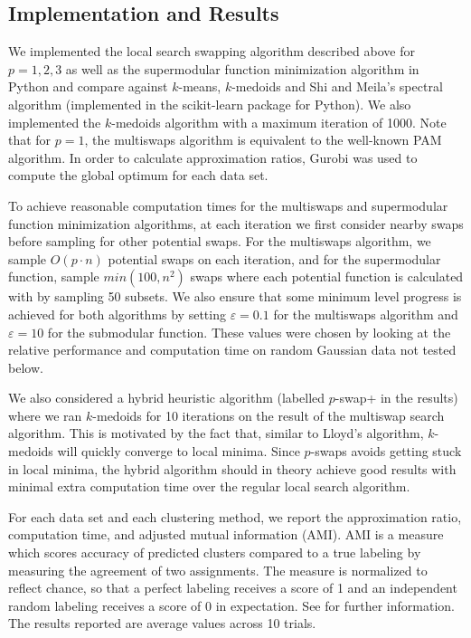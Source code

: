 \documentclass{article}
\begin{document}
\subsection{Implementation and Results}

We implemented the local search swapping algorithm described above for $p=1, 2, 3$ as well as the supermodular function minimization algorithm in Python and compare against $k$-means, $k$-medoids and Shi and Meila's spectral algorithm (implemented in the scikit-learn package for Python).  We also implemented the $k$-medoids algorithm with a maximum iteration of 1000. Note that for $p=1$, the multiswaps algorithm is equivalent to the well-known PAM algorithm.  In order to calculate approximation ratios, Gurobi was used to compute the global optimum for each data set.

To achieve reasonable computation times for the multiswaps and supermodular function minimization algorithms, at each iteration we first consider nearby swaps before sampling for other potential swaps. For the multiswaps algorithm, we sample $O(p\cdot n)$ potential swaps on each iteration, and for the supermodular function, sample $min(100,n^2)$ swaps where each potential function is calculated with by sampling 50 subsets. We also ensure that some minimum level progress is achieved for both algorithms by setting $\varepsilon = 0.1$ for the multiswaps algorithm and $\varepsilon = 10$ for the submodular function. These values were chosen by looking at the relative performance and computation time on random Gaussian data not tested below.   

We also considered a hybrid heuristic algorithm (labelled $p$-swap+ in the results) where we ran $k$-medoids for 10 iterations on the result of the multiswap search algorithm.  This is motivated by the fact that, similar to Lloyd's algorithm, $k$-medoids will quickly converge to local minima.  Since $p$-swaps avoids getting stuck in local minima, the hybrid algorithm should in theory achieve good results with minimal extra computation time over the regular local search algorithm.

For each data set and each clustering method, we report the approximation ratio, computation time, and adjusted mutual information (AMI).  AMI is a measure which scores accuracy of predicted clusters compared to a true labeling by measuring the agreement of two assignments. The measure is normalized to reflect chance, so that a perfect labeling receives a score of 1 and an independent random labeling receives a score of 0 in expectation.  See \cite{Vinh} for further information.  The results reported are average values across 10 trials.
\end{document}
